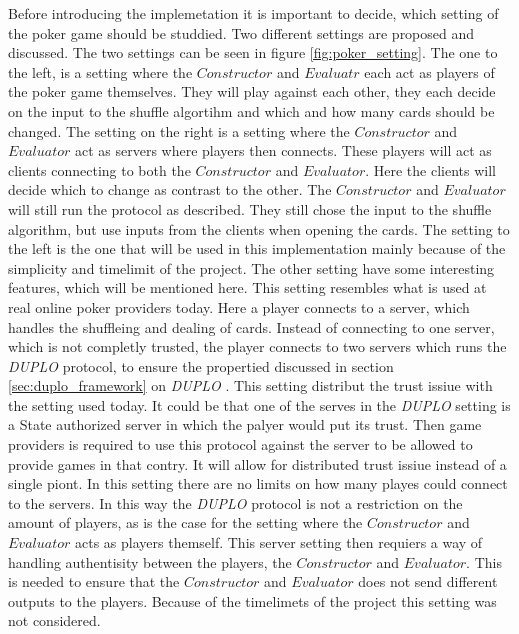 \documentclass[twoside,11pt,openright]{report}
\newcommand{\DUPLO}{\textit{DUPLO} }
\begin{document}
Before introducing the implemetation it is important to decide, which setting of the poker game should be studdied. Two different settings are proposed and discussed. The two settings can be seen in figure \ref{fig:poker_setting}. The one to the left, is a setting where the $Constructor$ and $Evaluatr$ each act as players of the poker game themselves. They will play against each other, they each decide on the input to the shuffle algortihm and which and how many cards should be changed. The setting on the right is a setting where the $Constructor$ and $Evaluator$ act as servers where players then connects. These players will act as clients connecting to both the $Constructor$ and $Evaluator$. Here the clients will decide which to change as contrast to the other. The $Constructor$ and $Evaluator$ will still run the protocol as described. They still chose the input to the shuffle algorithm, but use inputs from the clients when opening the cards. The setting to the left is the one that will be used in this implementation mainly because of the simplicity and timelimit of the project. The other setting have some interesting features, which will be mentioned here. This setting resembles what is used at real online poker providers today. Here a player connects to a server, which handles the shuffleing and dealing of cards. Instead of connecting to one server, which is not completly trusted, the player connects to two servers which runs the \DUPLO protocol, to ensure the propertied discussed in section \ref{sec:duplo_framework} on \DUPLO. This setting distribut the trust issiue with the setting used today. It could be that one of the serves in the \DUPLO setting is a State authorized server in which the palyer would put its trust. Then game providers is required to use this protocol against the server to be allowed to provide games in that contry. It will allow for distributed trust issiue instead of a single piont. In this setting there are no limits on how many playes could connect to the servers. In this way the \DUPLO protocol is not a restriction on the amount of players, as is the case for the setting where the $Constructor$ and $Evaluator$ acts as players themself. This server setting then requiers a way of handling authentisity between the players, the $Constructor$ and $Evaluator$. This is needed to ensure that the $Constructor$ and $Evaluator$ does not send different outputs to the players. Because of the timelimets of the project this setting was not considered.

\bigskip
\end{document}
